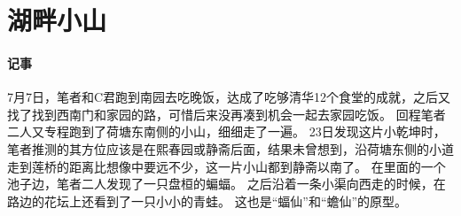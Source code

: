 \section{湖畔小山}

\vfill

\paragraph{记事}
7月7日，笔者和C君跑到南园去吃晚饭，达成了吃够清华12个食堂的成就，之后又找了找到西南门和家园的路，可惜后来没再凑到机会一起去家园吃饭。
回程笔者二人又专程跑到了荷塘东南侧的小山，细细走了一遍。
23日发现这片小乾坤时，笔者推测的其方位应该是在熙春园或静斋后面，结果未曾想到，沿荷塘东侧的小道走到莲桥的距离比想像中要远不少，这一片小山都到静斋以南了。
在里面的一个池子边，笔者二人发现了一只盘桓的蝙蝠。
之后沿着一条小渠向西走的时候，在路边的花坛上还看到了一只小小的青蛙。
这也是“蝠仙”和“蟾仙”的原型。

